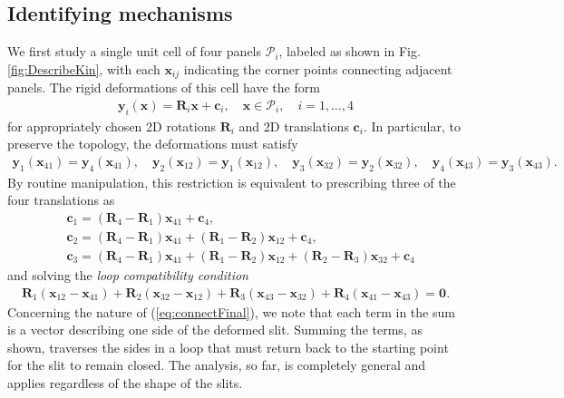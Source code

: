 \documentclass[aps,11pt,tightenlines,notitlepage,superscriptaddress,longbibliography,nofootinbib]{revtex4-1}
\begin{document}
\subsection{Identifying mechanisms}
We first study a single unit cell of four panels $\mathcal{P}_i$, labeled as shown in Fig.\;\ref{fig:DescribeKin}, with each $\mathbf{x}_{ij}$ indicating the corner points connecting adjacent  panels. 
The rigid deformations of this cell have the form 
\begin{equation}
\begin{aligned}\label{eq:Rigid0}
\mathbf{y}_i(\mathbf{x}) = \mathbf{R}_{i} \mathbf{x}+ \mathbf{c}_i, \quad \mathbf{x} \in \mathcal{P}_i, \quad i = 1,\ldots,4
\end{aligned}
\end{equation}
for appropriately chosen 2D rotations $\mathbf{R}_i$ and 2D translations $\mathbf{c}_i$.  In particular, to preserve the topology, the deformations must satisfy 
\begin{equation}
\begin{aligned}\label{eq:connect}
\mathbf{y}_{1}(\mathbf{x}_{41}) = \mathbf{y}_4(\mathbf{x}_{41}), \quad \mathbf{y}_2(\mathbf{x}_{12}) =\mathbf{y}_1(\mathbf{x}_{12}), \quad \mathbf{y}_{3}(\mathbf{x}_{32}) = \mathbf{y}_{2}(\mathbf{x}_{32}), \quad \mathbf{y}_{4}(\mathbf{x}_{43}) = \mathbf{y}_{3}(\mathbf{x}_{43}).
\end{aligned}
\end{equation}
By routine manipulation, this restriction is equivalent to prescribing three of the four translations as 
\begin{equation}
\begin{aligned}\label{eq:c123}
&\mathbf{c}_1 = (\mathbf{R}_4 - \mathbf{R}_1) \mathbf{x}_{41} + \mathbf{c}_4, \\
&\mathbf{c}_2 = (\mathbf{R}_4 - \mathbf{R}_1) \mathbf{x}_{41} + (\mathbf{R}_1 - \mathbf{R}_2) \mathbf{x}_{12} +  \mathbf{c}_4, \\
&\mathbf{c}_3 = (\mathbf{R}_4 - \mathbf{R}_1) \mathbf{x}_{41} + (\mathbf{R}_1 - \mathbf{R}_2)  \mathbf{x}_{12} + (\mathbf{R}_2 - \mathbf{R}_3) \mathbf{x}_{32} + \mathbf{c}_4
\end{aligned}
\end{equation}
and solving the \textit{loop compatibility condition}
\begin{equation}
\begin{aligned}\label{eq:connectFinal}
\mathbf{R}_1( \mathbf{x}_{12} - \mathbf{x}_{41}) + \mathbf{R}_{2}(\mathbf{x}_{32} - \mathbf{x}_{12}) + \mathbf{R}_3(\mathbf{x}_{43} - \mathbf{x}_{32}) + \mathbf{R}_4 (\mathbf{x}_{41} - \mathbf{x}_{43}) = \mathbf{0}.
\end{aligned}
\end{equation}
Concerning the nature of  (\ref{eq:connectFinal}), we note that each term in the sum is a vector describing one side of the deformed slit.  Summing the terms, as shown, traverses the sides in a loop that must return back to the starting point for the slit to remain closed.
The analysis, so far, is completely general and applies regardless of the shape of the slits.
\end{document}

